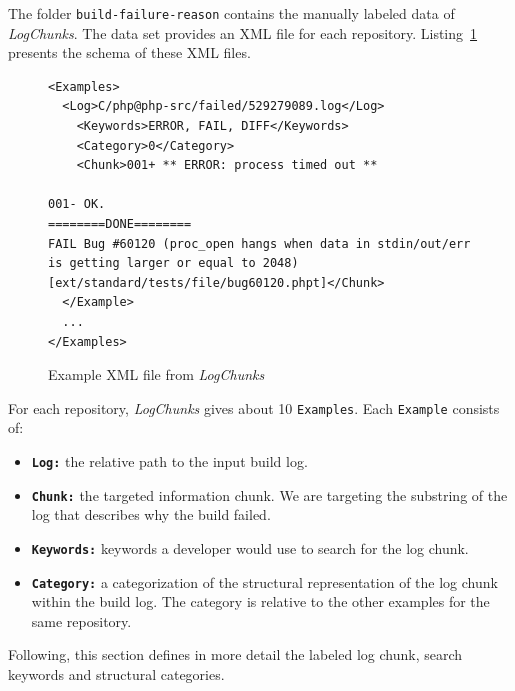 \documentclass[\myrootdir/main.tex]{subfiles}
\begin{document}
The folder \texttt{build-failure-reason} contains the manually labeled data of \emph{LogChunks}.
The data set provides an XML file for each repository.
Listing~\ref{lst:examples} presents the schema of these XML files.

\begin{figure}[]
	\centering
\begin{lstlisting}[breaklines=true]
<Examples>
  <Log>C/php@php-src/failed/529279089.log</Log>
    <Keywords>ERROR, FAIL, DIFF</Keywords>
    <Category>0</Category>
    <Chunk>001+ ** ERROR: process timed out **

001- OK.
========DONE========
FAIL Bug #60120 (proc_open hangs when data in stdin/out/err is getting larger or equal to 2048) [ext/standard/tests/file/bug60120.phpt]</Chunk>
  </Example>
  ...
</Examples>
\end{lstlisting}
	
	\caption{Example XML file from \emph{LogChunks}}
	\label{lst:examples}
\end{figure}

For each repository, \emph{LogChunks} gives about 10 \texttt{Examples}.
Each \texttt{Example} consists of:
\begin{itemize}
	\item \textbf{\texttt{Log:}} the relative path to the input build log.
	\item \textbf{\texttt{Chunk:}} the targeted information chunk. We are targeting the substring of the log that describes why the build failed.
	\item \textbf{\texttt{Keywords:}} keywords a developer would use to search for the log chunk.
	\item \textbf{\texttt{Category:}} a categorization of the structural representation of the log chunk within the build log.
				The category is relative to the other examples for the same repository.
\end{itemize}
Following, this section defines in more detail the labeled log chunk, search keywords and structural categories.
\end{document}
